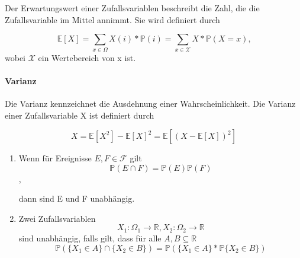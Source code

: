 \vspace{5pt}

 Der Erwartungswert einer Zufallsvariablen beschreibt die Zahl, die die Zufallsvariable im Mittel annimmt.
Sie wird definiert durch

\begin{equation*}
\mathbb{E} [X] = \sum_{x \in \Omega} X (i) * \mathbb{P} ({i}) = \sum_{x\in\mathcal{X}} X* \mathbb{P} (X=x) \text{,}
\end{equation*}
wobei $\mathcal{X}$ ein Wertebereich von x ist.

\vspace{10pt}

\paragraph {Varianz}

\vspace{5pt}

Die Varianz kennzeichnet die Ausdehnung einer Wahrscheinlichkeit. Die Varianz einer Zufallsvariable X ist definiert durch


\begin{equation*}
X= \mathbb{E} [X^2] - \mathbb{E} [X]^2 = \mathbb{E} [ (X - \mathbb{E} [X] )^2 ] 
\end{equation*}

\vspace{10pt}

\begin{Def}

\vspace{5pt}

\begin{enumerate}
	\item Wenn f\"ur Ereignisse $E, F \in \mathcal{F} $ gilt
	\begin{equation} \mathbb{P} (E\cap F)= \mathbb{P} (E)  \mathbb{P} (F) \end{equation},

dann sind E und F unabh\"angig. 

\item Zwei Zufallsvariablen 
\begin{equation*}
X_{1}: \Omega_{1} \longrightarrow \mathbb{R}, X_{2}: \Omega_{2} \longrightarrow \mathbb{R}
\end{equation*}
sind unabh\"angig, falls gilt, dass f\"ur alle $A, B \subseteq \mathbb{R}$
\begin{equation*}
\mathbb{P} (\{X_{1} \in A\} \cap \{X_{2} \in B\} ) = \mathbb{P} (\{X_{1} \in A\} * \mathbb{P} \{X_{2} \in B\} )
\end{equation*}
\end{enumerate}
\end{Def}
\vspace{10pt}

